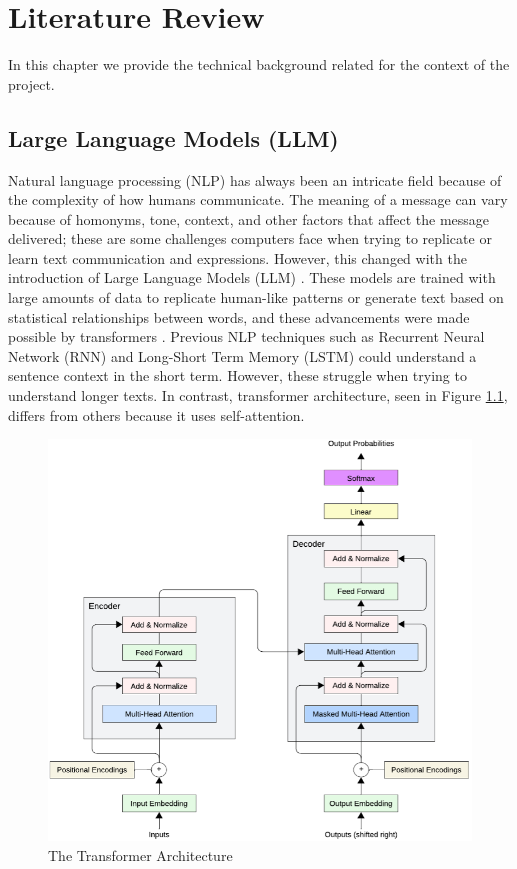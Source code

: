 

\chapter{Literature Review}  

\noindent In this chapter we provide the technical background related for the context of the project.


\section{Large Language Models (LLM)}
Natural language processing (NLP) has always been an intricate field because of the complexity of how humans communicate. The meaning of a message
can vary because of homonyms, tone, context, and other factors that affect the message delivered; these are some challenges computers face when trying
to replicate or learn text communication and expressions.  However, this changed with the introduction of Large Language Models (LLM) \cite{naveed2024comprehensiveoverviewlargelanguage}.
These models are trained with large amounts of data to replicate human-like patterns or generate text based on statistical relationships between words, and these
advancements were made possible by transformers \cite{vaswani2023attentionneed}. Previous NLP techniques such as Recurrent Neural Network (RNN) and
Long-Short Term Memory (LSTM) could understand a sentence context in the short term. However, these struggle when trying to understand longer texts.
In contrast, transformer architecture, seen in Figure \ref{transformer}, differs from others because it uses self-attention.

\begin{figure}[!hb]
    \centering
        \includegraphics[width=1\linewidth]{images/transformers_architecture.png}
        \caption{The Transformer Architecture}
        \label{transformer}
\end{figure}

